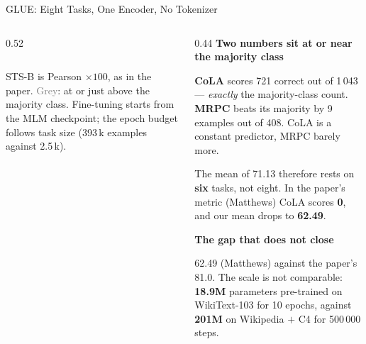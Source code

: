 \documentclass[aspectratio=169,11pt]{beamer}
\newcommand{\colhead}[1]{{\color{HeadBlue}\bfseries #1}\par\vspace{0.25em}}
\newcommand{\alerthead}[1]{{\color{AccentRed}\bfseries #1}\par\vspace{0.25em}}
\begin{document}
\begin{frame}[shrink=11]{GLUE: Eight Tasks, One Encoder, No Tokenizer}
\begin{columns}[T,onlytextwidth]
\begin{column}{0.52\textwidth}
\begin{table}
\begin{tabular}{llcc}
        \end{tabular}
      \end{table}
      \scriptsize STS-B is Pearson $\times 100$, as in the paper. \textcolor{gray}{Grey}: at or just above the majority class. Fine-tuning starts from the MLM checkpoint; the epoch budget follows task size (393\,k examples against 2.5\,k).
    \end{column}
    \begin{column}{0.44\textwidth}
      \alerthead{Two numbers sit at or near the majority class}
        \small
        \textbf{CoLA} scores 721 correct out of 1\,043 --- \emph{exactly} the majority-class count. \textbf{MRPC} beats its majority by 9 examples out of 408. CoLA is a constant predictor, MRPC barely more.

        \vspace{0.3em}
        The mean of 71.13 therefore rests on \textbf{six} tasks, not eight. In the paper's metric (Matthews) CoLA scores \textbf{0}, and our mean drops to \textbf{62.49}.
      

      \vspace{0.3em}
      \colhead{The gap that does not close}
        \small
        62.49 (Matthews) against the paper's 81.0. The scale is not comparable: \textbf{18.9M} parameters pre-trained on WikiText-103 for 10 epochs, against \textbf{201M} on Wikipedia $+$ C4 for 500\,000 steps.
      
    \end{column}
  \end{columns}
\end{frame}
\end{document}
